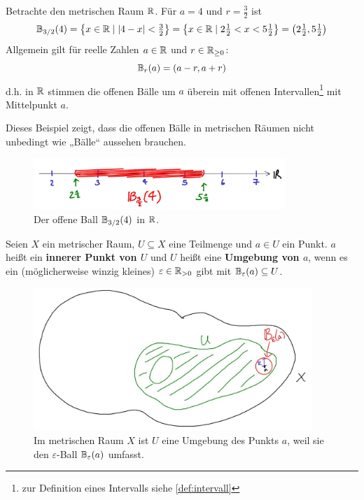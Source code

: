 \begin{bsp} \label{intervallbaelle}
    Betrachte den metrischen Raum $\mathbb R$. Für $a=4$ und $r= \frac{3}{2}$ ist
        \[ \mathbb B_{3/2}(4) = \left\{ x\in \mathbb R\mid \vert 4-x\vert <\tfrac{3}{2} \right\} = \left\{ x\in \mathbb R\mid 2\tfrac{1}{2}<x<5\tfrac{1}{2} \right\} = \left(2\tfrac{1}{2},5\tfrac{1}{2}\right) \]
    Allgemein gilt für reelle Zahlen $a\in \mathbb R$ und $r\in \mathbb R_{\ge 0}$:
        \[ \mathbb B_r(a) = (a-r,a+r) \]
    d.h. in $\mathbb R$ stimmen die offenen Bälle um $a$ überein mit offenen Intervallen\footnote{zur Definition eines Intervalls siehe \cref{def:intervall}} mit Mittelpunkt $a$.
    
    Dieses Beispiel zeigt, dass die offenen Bälle in metrischen Räumen nicht unbedingt wie „Bälle“ aussehen brauchen.
    \begin{figure}[ht]
        \includegraphics[width=9.5cm]{./_img/1Dball.jpeg}
        \centering \caption{Der offene Ball $\mathbb B_{3/2}(4)$ in $\mathbb R$.}
    \end{figure}
\end{bsp}


\begin{defin} \label{def:umgebung}  
    Seien $X$ ein metrischer Raum, $U\subseteq X$ eine Teilmenge und $a\in U$ ein Punkt. $a$ heißt ein \textbf{innerer Punkt von $U$} und $U$ heißt eine \textbf{Umgebung von $a$}, wenn es ein (möglicherweise winzig kleines) $\varepsilon\in \mathbb R_{>0}$ gibt mit $\mathbb B_\varepsilon(a)\subseteq U$.
    \begin{figure}[ht!]
        \includegraphics[width=10.5cm]{./_img/Umgebung.jpeg}
        \centering \caption{Im metrischen Raum $X$ ist $U$ eine Umgebung des Punkts $a$, weil sie den $\varepsilon$-Ball $\mathbb B_\varepsilon(a)$ umfasst.}
    \end{figure}
\end{defin}


